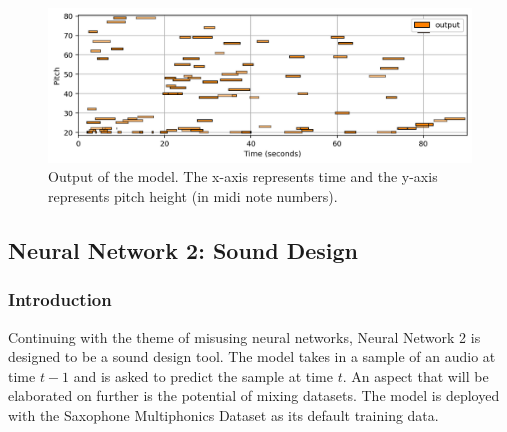 \documentclass{article}
\begin{document}
\begin{figure}[h]
	\centering
	\includegraphics[width=\columnwidth]{images/outputplot_nn1.png}
	\caption{Output of the model. The x-axis represents time and the y-axis represents pitch height (in midi note numbers).}
	\label{fig:outputplot_nn1}
\end{figure}

\subsection{Neural Network 2: Sound Design}
\subsubsection{Introduction}
Continuing with the theme of misusing neural networks, Neural Network 2 is designed to be a sound design tool. The model takes in a sample of an audio at time $t-1$ and is asked to predict the sample at time $t$. An aspect that will be elaborated on further is the potential of mixing datasets. The model is deployed with the Saxophone Multiphonics Dataset as its default training data.
\end{document}
